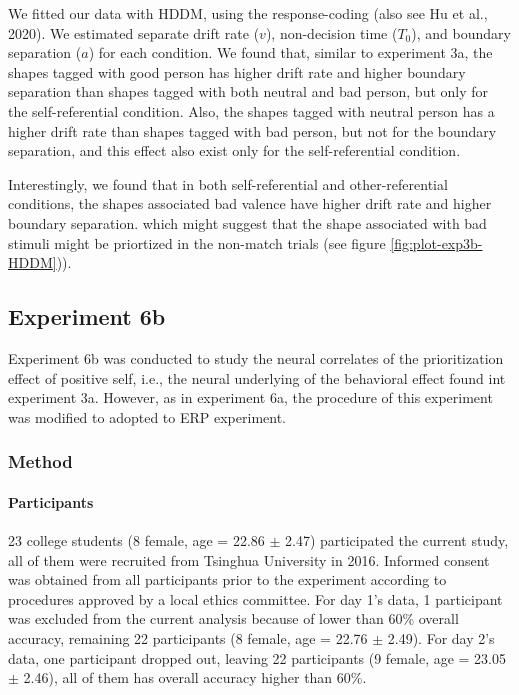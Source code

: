 \documentclass[
  english,
  man]{apa6}
\let\oldparagraph\paragraph
\renewcommand{\paragraph}[1]{\oldparagraph{#1}\mbox{}}
\begin{document}
We fitted our data with HDDM, using the response-coding (also see Hu et al., 2020). We estimated separate drift rate (\(v\)), non-decision time (\(T_{0}\)), and boundary separation (\(a\)) for each condition. We found that, similar to experiment 3a, the shapes tagged with good person has higher drift rate and higher boundary separation than shapes tagged with both neutral and bad person, but only for the self-referential condition. Also, the shapes tagged with neutral person has a higher drift rate than shapes tagged with bad person, but not for the boundary separation, and this effect also exist only for the self-referential condition.

Interestingly, we found that in both self-referential and other-referential conditions, the shapes associated bad valence have higher drift rate and higher boundary separation. which might suggest that the shape associated with bad stimuli might be priortized in the non-match trials (see figure \ref{fig:plot-exp3b-HDDM})).

\hypertarget{experiment-6b}{%
\subsection{Experiment 6b}\label{experiment-6b}}

Experiment 6b was conducted to study the neural correlates of the prioritization effect of positive self, i.e., the neural underlying of the behavioral effect found int experiment 3a. However, as in experiment 6a, the procedure of this experiment was modified to adopted to ERP experiment.

\hypertarget{method-5}{%
\subsubsection{Method}\label{method-5}}

\hypertarget{participants-7}{%
\paragraph{Participants}\label{participants-7}}

23 college students (8 female, age = 22.86 \(\pm\) 2.47) participated the current study, all of them were recruited from Tsinghua University in 2016. Informed consent was obtained from all participants prior to the experiment according to procedures approved by a local ethics committee. For day 1's data, 1 participant was excluded from the current analysis because of lower than 60\% overall accuracy, remaining 22 participants (8 female, age = 22.76 \(\pm\) 2.49). For day 2's data, one participant dropped out, leaving 22 participants (9 female, age = 23.05 \(\pm\) 2.46), all of them has overall accuracy higher than 60\%.
\end{document}
